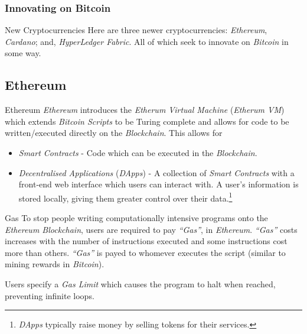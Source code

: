 \documentclass[11pt,a4paper]{article}
\begin{document}
\subsubsection{Innovating on Bitcoin} \label{sec_InnovatingOnBitcoin}

  \begin{remark}{New Cryptocurrencies}
    Here are three newer cryptocurrencies: \textit{Ethereum}, \textit{Cardano}; and, \textit{HyperLedger Fabric}. All of which seek to innovate on \textit{Bitcoin} in some way.
  \end{remark}

\subsection*{Ethereum}

  \begin{proposition}{Ethereum}
    \textit{Ethereum} introduces the \textit{Etherum Virtual Machine} (\textit{Etherum VM}) which extends \textit{Bitcoin Scripts} to be Turing complete and allows for code to be written/executed directly on the \textit{Blockchain}. This allows for
    \begin{itemize}
      \item \textit{Smart Contracts} - Code which can be executed in the \textit{Blockchain}.
      \item \textit{Decentralised Applications} (\textit{DApps}) - A collection of \textit{Smart Contracts} with a front-end web interface which users can interact with. A user's information is stored locally, giving them greater control over their data.\footnote{\textit{DApps} typically raise money by selling tokens for their services.}
    \end{itemize}
  \end{proposition}

  \begin{remark}{Gas}
    To stop people writing computationally intensive programs onto the \textit{Ethereum Blockchain}, users are required to pay \textit{``Gas''}, in \textit{Ethereum}. \textit{``Gas''} costs increases with the number of instructions executed and some instructions cost more than others. \textit{``Gas''} is payed to whomever executes the script (similar to mining rewards in \textit{Bitcoin}).
    \par Users specify a \textit{Gas Limit} which causes the program to halt when reached, preventing infinite loops.
  \end{remark}
\end{document}
